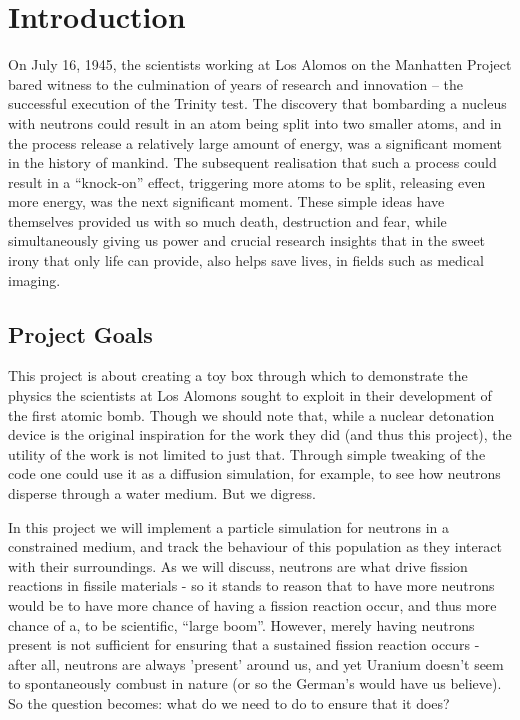 

\section{Introduction}

On July 16, 1945, the scientists working at Los Alomos on the Manhatten Project bared witness to the culmination of years 
of research and innovation -- the successful execution of the Trinity test. The discovery that bombarding a nucleus with neutrons 
could result in an atom being split into two smaller atoms, and in the process release a relatively large amount of energy, was 
a significant moment in the history of mankind. The subsequent realisation that such a process could result in a ``knock-on'' effect, 
triggering more atoms to be split, releasing even more energy, was the next significant moment. These simple ideas have themselves 
provided us with so much death, destruction and fear, while simultaneously giving us power and crucial research insights that in the 
sweet irony that only life can provide, also helps save lives, in fields such as medical imaging.



\subsection{Project Goals}

This project is about creating a toy box through which to demonstrate the physics the scientists at Los Alomons sought to exploit 
in their development of the first atomic bomb. Though we should note that, while a nuclear detonation device is the original 
inspiration for the work they did (and thus this project), the utility of the work is not limited to just that. Through simple 
tweaking of the code one could use it as a diffusion simulation, for example, to see how neutrons disperse through a water medium. But 
we digress. 

In this project we will implement a particle simulation for neutrons in a constrained medium, and track the behaviour of this population 
as they interact with their surroundings. As we will discuss, neutrons are what drive fission reactions in fissile materials - so it 
stands to reason that to have more neutrons would be to have more chance of having a fission reaction occur, and thus more chance of a, 
to be scientific, ``large boom''. However, merely having neutrons present is not sufficient for ensuring that a sustained fission reaction occurs 
- after all, neutrons are always 'present' around us, and yet Uranium doesn't seem to spontaneously combust in nature (or so the German's would have 
us believe). So the question becomes: what do we need to do to ensure that it does? 

